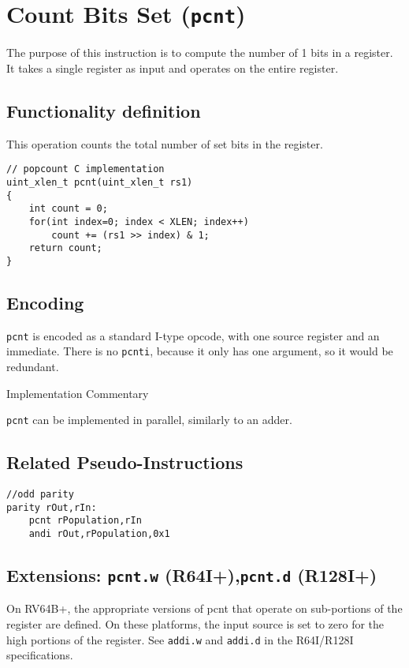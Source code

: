 \section{Count Bits Set (\texttt{pcnt})}

The purpose of this instruction is to compute the number of 1 bits in a
register. It takes a single register as input and operates on the entire
register.

\subsection{Functionality definition}

This operation counts the total number of set bits in the register.

\begin{verbatim}
// popcount C implementation
uint_xlen_t pcnt(uint_xlen_t rs1)
{
    int count = 0;
    for(int index=0; index < XLEN; index++)
        count += (rs1 >> index) & 1;
    return count;
}
\end{verbatim}

\subsection{Encoding}



\texttt{pcnt} is encoded as a standard I-type opcode, with one source
register and an immediate. There is no \texttt{pcnti}, because it only
has one argument, so it would be redundant.

Implementation Commentary

\texttt{pcnt} can be implemented in parallel, similarly to an adder.

\subsection{Related Pseudo-Instructions}

\begin{verbatim}
//odd parity
parity rOut,rIn:
    pcnt rPopulation,rIn
    andi rOut,rPopulation,0x1
\end{verbatim}

\subsection{Extensions: \texttt{pcnt.w} (R64I+),\texttt{pcnt.d} (R128I+)}

On RV64B+, the appropriate versions of pcnt that operate on sub-portions
of the register are defined. On these platforms, the input source is set
to zero for the high portions of the register. See \texttt{addi.w} and
\texttt{addi.d} in the R64I/R128I specifications.

